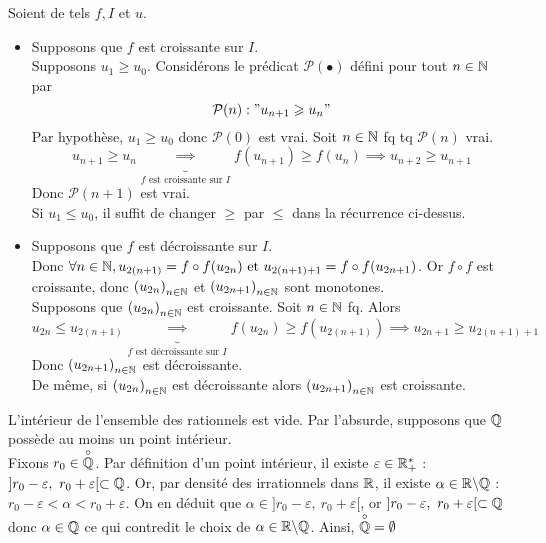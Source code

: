 \documentclass{article}
\begin{document}
\begin{question_kholle}
		Soient de tels $f, I$ et $u$.
		\begin{itemize}
			\item Supposons que $f$ est croissante sur $I$. \\
			Supposons $u_1 \geqslant u_0$. Considérons le prédicat $\mathcal{P}(\bullet)$ défini pour tout $n \in \mathbb N$ par
			\begin{equation*}
				\mathcal{P}(n) : " u_{n+1} \geqslant u_n "
			\end{equation*}
			\subitem Par hypothèse, $u_1 \geqslant u_0$ donc $\mathcal{P}(0)$ est vrai.
			\subitem Soit $n \in \mathbb N$ fq tq $\mathcal{P}(n)$ vrai. \\
			\begin{equation*}
				u_{n+1} \geqslant u_n
				\underbrace{\implies}_{f \text{ est croissante sur } I} f(u_{n+1}) \geqslant f(u_n)
				\implies u_{n+2} \geqslant u_{n+1}
			\end{equation*}
			Donc $\mathcal{P}(n+1)$ est vrai. \\
			Si $u_1 \leqslant u_0$, il suffit de changer $\geqslant$ par $\leqslant$ dans la récurrence ci-dessus.
			\item Supposons que $f$ est décroissante sur $I$. \\
			Donc $\forall n \in \mathbb N, u_{2(n+1)} = f \circ f(u_{2n}) \text{ et } u_{2(n+1)+1} = f \circ f(u_{2n+1})$. Or $f \circ f$ est croissante, donc $\left(u_{2n}\right)_{n\in\mathbb N}$ et $\left(u_{2n+1}\right)_{n\in\mathbb N}$ sont monotones. \\
			Supposons que $\left(u_{2n}\right)_{n\in\mathbb N}$ est croissante.
			Soit $n \in \mathbb N$ fq. Alors
			\begin{equation*}
				u_{2n} \leqslant u_{2(n+1)}
				\underbrace{\implies}_{f \text{ est décroissante sur } I} f(u_{2n}) \geqslant f(u_{2(n+1)})
				\implies u_{2n+1} \geqslant u_{2(n+1)+1}
			\end{equation*}
			Donc $\left(u_{2n+1}\right)_{n\in\mathbb N}$ est décroissante. \\
			De même, si $\left(u_{2n}\right)_{n\in\mathbb N}$ est décroissante alors $\left(u_{2n+1}\right)_{n\in\mathbb N}$ est croissante.
		\end{itemize}
	\end{question_kholle}
	
	\begin{question_kholle}
	    [Montrons que : $ \overset{\circ}{\Q} = \emptyset $]
	    {L'intérieur de l'ensemble des rationnels est vide.}
	    Par l'absurde, supposons que $\mathbb Q$ possède au moins un point intérieur. \\ Fixons $r_0 \in \overset{\circ}{\mathbb Q}$. Par définition d'un point intérieur, il existe $\varepsilon \in \mathbb R _+ ^* $ : $]r_0 - \varepsilon , \ r_0 + \varepsilon[ \subset \mathbb Q$. Or, par densité des irrationnels dans $\mathbb R$, il existe $\alpha \in \mathbb R \backslash \mathbb Q$ : $r_0 - \varepsilon < \alpha < r_0 + \varepsilon$. On en déduit que $\alpha \in ]r_0 - \varepsilon , \ r_0 + \varepsilon[$, or $]r_0 - \varepsilon , \ r_0 + \varepsilon[ \subset \mathbb Q$ donc $\alpha \in \mathbb Q$ ce qui contredit le choix de $\alpha \in \mathbb R \backslash \mathbb Q$. Ainsi, $\overset{\circ}{\Q} = \emptyset$
	\end{question_kholle}
	
\end{document}

